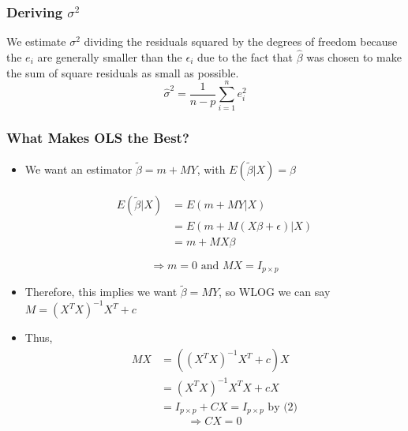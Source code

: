 \documentclass{beamer}
\begin{document}
	\begin{frame}[t]\frametitle{Deriving $\sigma^2$}
		We estimate $\sigma^2$ dividing the residuals squared by the degrees of freedom because the $e_{i}$ are generally smaller than the $\epsilon_{i}$ due to the fact that $\hat{\beta}$ was chosen to make the sum of square residuals as small as possible.
		\[ \hat{\sigma}^2 = \frac{1}{n-p}\sum_{i = 1}^{n} e_{i}^2 \]
	\end{frame}




\begin{frame}[t]\frametitle{What Makes OLS the Best?}
	\begin{itemize}
		\item<+-> We want an estimator $\tilde{\beta}=m+MY$,
                  with $E(\tilde{\beta}|X)=\beta$ 

                  \[ \begin{array}{rl}
                    E(\tilde{\beta} | X) & = E(m + MY | X)  \\
                    & =   E(m + M(X\beta + \epsilon) | X) \\
                    &= m + MX\beta
			\end{array} \]
                 
                  \begin{equation} \Rightarrow m = 0 \text{ and }MX =
                    I_{p \times p} \end{equation} 
                \item <+->Therefore, this implies we want $\tilde{\beta} =
                  MY$, so WLOG we can say $M = (X^{T}X)^{-1}X^{T} + c$

                \item <+-> Thus,
                  \[ \begin{array}{rl} MX & = ((X^{T}X)^{-1}X^{T} +
                    c)X \\ & = (X^{T}X)^{-1}X^{T}X + cX \\
                    & = I_{p \times p} + CX = I_{p \times p} \text{ by
                      (2)}
\end{array} \]
\begin{equation} \Rightarrow CX = 0 \end{equation}


	\end{itemize}
	\end{frame}
	
\end{document}
